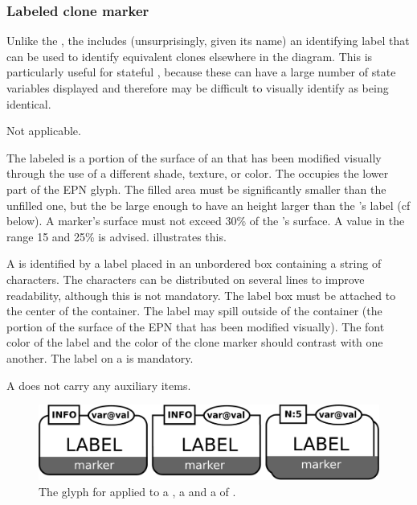 \subsubsection{Labeled clone marker}

Unlike the , the  includes (unsurprisingly, given its name) an identifying label that can be used to identify equivalent clones elsewhere in the diagram.  This is particularly useful for stateful , because these can have a large number of state variables displayed and therefore may be difficult to visually identify as being identical.

\begin{glyphDescription}

\glyphSboTerm Not applicable.

\glyphContainer The labeled  is a portion of the surface of an  that has been modified visually through the use of a different shade, texture, or color.  The  occupies the lower part of the EPN glyph. The filled area must be significantly smaller than the unfilled one, but the be large enough to have an height larger than the 's label (cf below). A marker's surface must not exceed 30\% of the 's surface. A value in the range 15 and 25\% is advised.  illustrates this.   

\glyphLabel A  is identified by a label placed in an unbordered box containing a string of characters.  The characters can be distributed on several lines to improve readability, although this is not mandatory.  The label box must be attached to the center of the container.  The label may spill outside of the container (the portion of the surface
of the EPN that has been modified visually).  The font color of the label and the color of the clone marker should contrast with one another.  The label on a  is mandatory.

\glyphAux A  does not carry any auxiliary items.

\end{glyphDescription}

\begin{figure}[H]
  \centering
  \includegraphics[scale = 0.3]{images/labeledCloneMarker}
  \caption{The \PD glyph for  applied to a , a  and a  of .}
  \label{fig:labeledCloneMarker}
\end{figure}

